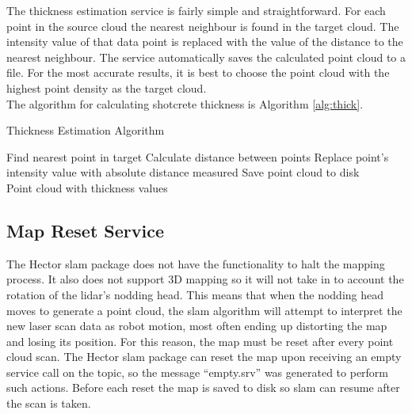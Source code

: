 The thickness estimation service is fairly simple and straightforward. For each point in the source cloud the nearest neighbour is found in the target cloud. The intensity value of that data point is replaced with the value of the distance to the nearest neighbour. The service automatically saves the calculated point cloud to a file. For the most accurate results, it is best to choose the point cloud with the highest point density as the target cloud.\\

The algorithm for calculating shotcrete thickness is Algorithm \ref{alg:thick}.

\begin{algorithm}[H]
\caption{Thickness Estimation Algorithm}
\label{alg:thick}
\begin{algorithmic}[1]
\begin{raggedright}
\State Find nearest point in target
\State Calculate distance between points
\State Replace point's intensity value with absolute distance measured
\EndFor
\State Save point cloud to disk
\EndFunction\\
\Return Point cloud with thickness values
\end{raggedright}
\end{algorithmic}
\end{algorithm}

\subsection{Map Reset Service}
The Hector \acrshort{slam} package does not have the functionality to halt the mapping process. It also does not support 3D mapping so it will not take in to account the rotation of the \acrshort{lidar}'s nodding head. This means that when the nodding head moves to generate a point cloud, the \acrshort{slam} algorithm will attempt to interpret the new laser scan data as robot motion, most often ending up distorting the map and losing its position. For this reason, the map must be reset after every point cloud scan. The Hector \acrshort{slam} package can reset the map upon receiving an empty service call on the  topic, so the message ``empty.srv'' was generated to perform such actions. Before each reset the map is saved to disk so \acrshort{slam} can resume after the scan is taken.\\

